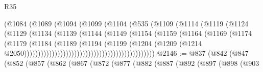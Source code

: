 \begin{lexlean}{R35}
\begin{coremodule}
                                          (@1084
                                            (@1089
                                              (@1094
                                                (@1099
                                                  (@1104
                                                    (@535
                                                      (@1109
                                                        (@1114
                                                          (@1119
                                                            (@1124
                                                              (@1129
                                                                (@1134
                                                                  (@1139
                                                                    (@1144
                                                                      (@1149
                                                                        (@1154
                                                                          (@1159
                                                                            (@1164
                                                                              (@1169
                                                                                (@1174
                                                                                  (@1179
                                                                                    (@1184
                                                                                      (@1189
                                                                                        (@1194
                                                                                          (@1199
                                                                                            (@1204
                                                                                              (@1209
                                                                                                (@1214
                                                                                                  @2050)))))))))))))))))))))))))))))))))))))))))))))))
@2146 := @837
    (@842
      (@847
        (@852
          (@857
            (@862
              (@867
                (@872
                  (@877
                    (@882
                      (@887
                        (@892
                          (@897
                            (@898
                              (@903

\end{coremodule}
\end{lexlean}
